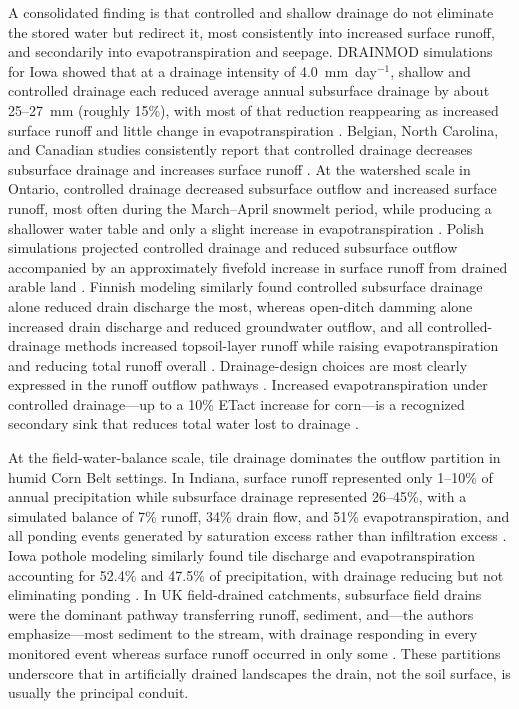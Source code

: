 \documentclass[11pt]{article}
\begin{document}
A consolidated finding is that controlled and shallow drainage do not eliminate
the stored water but redirect it, most consistently into increased surface
runoff, and secondarily into evapotranspiration and seepage. DRAINMOD
simulations for Iowa showed that at a drainage intensity of 4.0~mm~day$^{-1}$,
shallow and controlled drainage each reduced average annual subsurface drainage
by about 25--27~mm (roughly 15\%), with most of that reduction reappearing as
increased surface runoff and little change in evapotranspiration
\parencite{Singh2007b}. Belgian, North Carolina, and Canadian studies
consistently report that controlled drainage decreases subsurface drainage and
increases surface runoff \parencite{ElSadek2002,ElSadek2002b,DEAL1986,Skaggs1995,Golmohammadi2016,Ndulue2024}.
At the watershed scale in Ontario, controlled drainage decreased subsurface
outflow and increased surface runoff, most often during the March--April
snowmelt period, while producing a shallower water table and only a slight
increase in evapotranspiration \parencite{Golmohammadi2016}. Polish simulations
projected controlled drainage and reduced subsurface outflow accompanied by an
approximately fivefold increase in surface runoff from drained arable land
\parencite{Sojka2020}. Finnish modeling similarly found controlled subsurface
drainage alone reduced drain discharge the most, whereas open-ditch damming
alone increased drain discharge and reduced groundwater outflow, and all
controlled-drainage methods increased topsoil-layer runoff while raising
evapotranspiration and reducing total runoff overall
\parencite{Isomäki2024}. Drainage-design choices are most clearly expressed in
the runoff outflow pathways \parencite{Isomäki2024}. Increased evapotranspiration
under controlled drainage---up to a 10\% ETact increase for corn---is a
recognized secondary sink that reduces total water lost to drainage
\parencite{deWit2022,DEAL1986,Ndulue2024}.

At the field-water-balance scale, tile drainage dominates the outflow partition
in humid Corn Belt settings. In Indiana, surface runoff represented only 1--10\%
of annual precipitation while subsurface drainage represented 26--45\%, with a
simulated balance of 7\% runoff, 34\% drain flow, and 51\% evapotranspiration,
and all ponding events generated by saturation excess rather than infiltration
excess \parencite{Saadat2020}. Iowa pothole modeling similarly found tile
discharge and evapotranspiration accounting for 52.4\% and 47.5\% of
precipitation, with drainage reducing but not eliminating ponding
\parencite{Amado2018,Martin2019}. In UK field-drained catchments, subsurface
field drains were the dominant pathway transferring runoff, sediment, and---the
authors emphasize---most sediment to the stream, with drainage responding in
every monitored event whereas surface runoff occurred in only some
\parencite{Deasy2009}. These partitions underscore that in artificially drained
landscapes the drain, not the soil surface, is usually the principal conduit.
\end{document}
